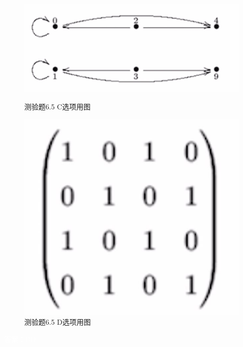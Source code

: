 \documentclass[UTF8, heading=true]{ctexart}
\begin{document}
\begin{figure}[H]
    \centering
    \begin{minipage}[t]{0.45\textwidth}
        \centering
        \includegraphics[width=1\textwidth]{6.5_1.jpg} %
	      \vspace{-0.3cm}
        \caption{测验题6.5 C选项用图}
    \end{minipage}
	  \hspace{0.1\textwidth} %
    \begin{minipage}[t]{0.23\textwidth}
        \centering
        \includegraphics[width=1\textwidth]{6.5_2.jpg} %
	      \vspace{-0.3cm}
        \caption{测验题6.5 D选项用图}
\end{minipage}
\end{figure}

\textcolor{white}{答案：BD}
\end{document}
